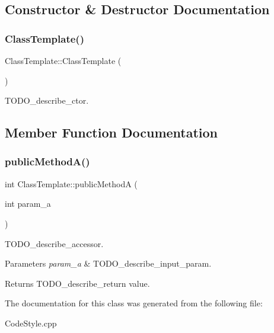 \subsection{Constructor \& Destructor Documentation}
\mbox{\label{class_class_template_adfe87f94a240d35f2e8b3798cf4459a8}} 
\subsubsection{\texorpdfstring{ClassTemplate()}{ClassTemplate()}}
{\footnotesize\ttfamily Class\+Template\+::\+Class\+Template (\begin{DoxyParamCaption}{ }\end{DoxyParamCaption})\hspace{0.3cm}{\ttfamily [inline]}}

T\+O\+D\+O\+\_\+describe\+\_\+ctor. 

\subsection{Member Function Documentation}
\mbox{\label{class_class_template_aa55e63ab656cc1e2930028cb6b065cdb}} 
\subsubsection{\texorpdfstring{publicMethodA()}{publicMethodA()}}
{\footnotesize\ttfamily int Class\+Template\+::public\+MethodA (\begin{DoxyParamCaption}\item[{int}]{param\+\_\+a }\end{DoxyParamCaption})}

T\+O\+D\+O\+\_\+describe\+\_\+accessor. 
\begin{DoxyParams}{Parameters}
{\em param\+\_\+a} & T\+O\+D\+O\+\_\+describe\+\_\+input\+\_\+param. \\
\hline
\end{DoxyParams}
\begin{DoxyReturn}{Returns}
T\+O\+D\+O\+\_\+describe\+\_\+return value. 
\end{DoxyReturn}


The documentation for this class was generated from the following file\+:\begin{DoxyCompactItemize}
\item 
Code\+Style.\+cpp\end{DoxyCompactItemize}
